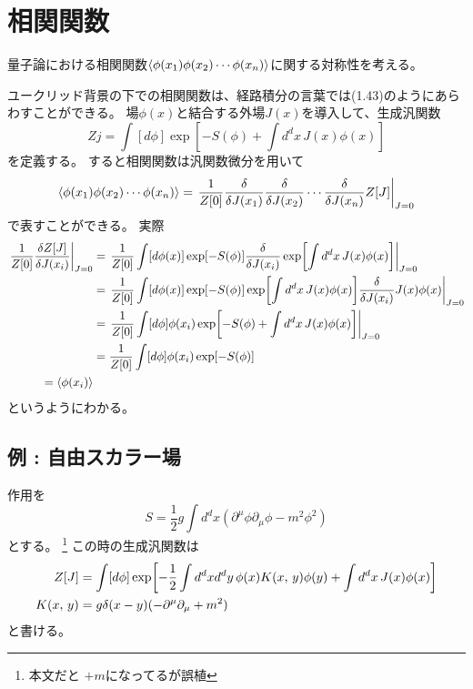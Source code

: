 \documentclass[../../master.tex]{subfiles}
\begin{document}
\setcounter{equation}{59}
\section{相関関数}
量子論における相関関数\(\ev{\phi(x_1)\phi(x_2)\cdots\phi(x_n)}\)に関する対称性を考える。

ユークリッド背景の下での相関関数は、経路積分の言葉では(1.43)のようにあらわすことができる。
場\(\phi(x)\)と結合する外場\(J(x)\)を導入して、生成汎関数
\begin{equation}
    Z{j} = \int [d\phi] \exp[-S(\phi)+\int d^dx\, J(x)\phi(x)]
\end{equation}
を定義する。
すると相関関数は汎関数微分を用いて
\begin{equation}
    \ev{\phi(x_1)\phi(x_2)\cdots\phi(x_n)} = \left. \frac{1}{Z[0]}\fdv{J(x_1)}\fdv{J(x_2)}\cdots\fdv{J(x_n)}Z[J]\right|_{J=0}
\end{equation}
で表すことができる。
実際
\begin{align*}
    \left.\frac{1}{Z[0]}\fdv{Z[J]}{J(x_i)}\right|_{J=0}
    &= \left.\frac{1}{Z[0]}\int [d\phi(x)]\exp[-S(\phi)]\fdv{J(x_i)}\exp[\int d^dx\, J(x)\phi(x)]\right|_{J=0}\\
    &= \left.\frac{1}{Z[0]}\int [d\phi(x)]\exp[-S(\phi)]\exp[\int d^dx\, J(x)\phi(x)]\fdv{J(x_i)}J(x)\phi(x)\right|_{J=0}\\
    &= \left.\frac{1}{Z[0]}\int [d\phi] \phi(x_i)\exp[-S(\phi)+\int d^dx\, J(x)\phi(x)]\right|_{J=0}\\
    &= \frac{1}{Z[0]}\int [d\phi] \phi(x_i)\exp[-S(\phi)]\\
    =\ev{\phi(x_i)}
\end{align*}
というようにわかる。

\subsection*{例 : 自由スカラー場}
作用を
\begin{equation}
    S = \frac{1}{2}g \int d^d x(\partial^\mu\phi\partial_\mu\phi - m^2\phi^2)
\end{equation}
とする。
\footnote{本文だと \(+m\)になってるが誤植}
この時の生成汎関数は
\begin{align}
    Z[J]
    &= \int [d\phi] \exp[-\frac{1}{2}\int d^dx d^d y\, \phi(x)K(x,\,y)\phi(y)+\int d^dx \,J(x)\phi(x)]\notag\\
    K(x,\,y) &= g\delta(x-y)(-\partial^\mu\partial_\mu+m^2)
\end{align}
と書ける。
\end{document}
